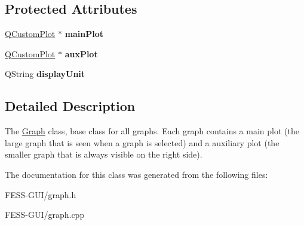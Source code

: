 \subsection*{Protected Attributes}
\begin{DoxyCompactItemize}
\item 
\hypertarget{class_graph_a02239013b745a7c1411a7f8623cc2073}{}\label{class_graph_a02239013b745a7c1411a7f8623cc2073} 
\hyperlink{class_q_custom_plot}{Q\+Custom\+Plot} $\ast$ {\bfseries main\+Plot}
\item 
\hypertarget{class_graph_ac7d10642e5439fd87d7d4bc5a33e643d}{}\label{class_graph_ac7d10642e5439fd87d7d4bc5a33e643d} 
\hyperlink{class_q_custom_plot}{Q\+Custom\+Plot} $\ast$ {\bfseries aux\+Plot}
\item 
\hypertarget{class_graph_a28488c31277fec31c8d54a44860efede}{}\label{class_graph_a28488c31277fec31c8d54a44860efede} 
Q\+String {\bfseries display\+Unit}
\end{DoxyCompactItemize}


\subsection{Detailed Description}
The \hyperlink{class_graph}{Graph} class, base class for all graphs. Each graph contains a main plot (the large graph that is seen when a graph is selected) and a auxiliary plot (the smaller graph that is always visible on the right side). 

The documentation for this class was generated from the following files\+:\begin{DoxyCompactItemize}
\item 
F\+E\+S\+S-\/\+G\+U\+I/graph.\+h\item 
F\+E\+S\+S-\/\+G\+U\+I/graph.\+cpp\end{DoxyCompactItemize}
